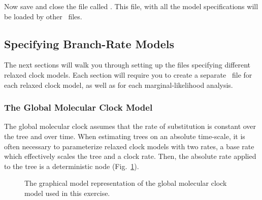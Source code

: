 %

Now save and close the file called {\textcolor{red}{}}. This file, with all the model specifications will be loaded by other \Rev~files. 

\bigskip
\subsection{Specifying Branch-Rate Models}\label{brMods} 

The next sections will walk you through setting up the files specifying different relaxed clock models. 
Each section will require you to create a separate \Rev~file for each relaxed clock model, as well as for each marginal-likelihood analysis.

\bigskip
\subsubsection{The Global Molecular Clock Model}\label{globalClockSec}

The global molecular clock assumes that the rate of substitution is constant over the tree and over time.
When estimating trees on an absolute time-scale, it is often necessary to parameterize relaxed clock models with two rates, a base rate which effectively scales the tree and a clock rate. 
Then, the absolute rate applied to the tree is a deterministic node (Fig.~\ref{m_GMC:fig}).

\begin{figure}[h!]
\centering
{}
\caption{\small The graphical model representation of the global molecular clock model used in this exercise.}
\label{m_GMC:fig}
\end{figure}

